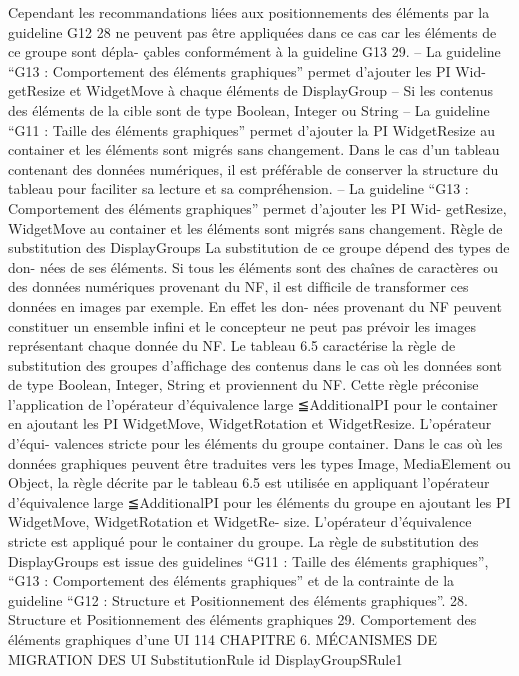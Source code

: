 \documentclass{article}
\begin{document}
Cependant les recommandations liées aux positionnements des éléments par la guideline
G12 28 ne peuvent pas être appliquées dans ce cas car les éléments de ce groupe sont dépla-
çables conformément à la guideline G13 29.
– La guideline “G13 : Comportement des éléments graphiques” permet d’ajouter les PI Wid-
getResize et WidgetMove à chaque éléments de DisplayGroup
– Si les contenus des éléments de la cible sont de type Boolean, Integer ou String
– La guideline “G11 : Taille des éléments graphiques” permet d’ajouter la PI WidgetResize au
container et les éléments sont migrés sans changement. Dans le cas d’un tableau contenant
des données numériques, il est préférable de conserver la structure du tableau pour faciliter
sa lecture et sa compréhension.
– La guideline “G13 : Comportement des éléments graphiques” permet d’ajouter les PI Wid-
getResize, WidgetMove au container et les éléments sont migrés sans changement.
Règle de substitution des DisplayGroups
La substitution de ce groupe dépend des types de don-
nées de ses éléments. Si tous les éléments sont des chaînes de caractères ou des données numériques
provenant du NF, il est difﬁcile de transformer ces données en images par exemple. En effet les don-
nées provenant du NF peuvent constituer un ensemble inﬁni et le concepteur ne peut pas prévoir
les images représentant chaque donnée du NF. Le tableau 6.5 caractérise la règle de substitution des
groupes d’afﬁchage des contenus dans le cas où les données sont de type Boolean, Integer, String et
proviennent du NF. Cette règle préconise l’application de l’opérateur d’équivalence large ≦AdditionalPI
pour le container en ajoutant les PI WidgetMove, WidgetRotation et WidgetResize. L’opérateur d’équi-
valences stricte pour les éléments du groupe container.
Dans le cas où les données graphiques peuvent être traduites vers les types Image, MediaElement
ou Object, la règle décrite par le tableau 6.5 est utilisée en appliquant l’opérateur d’équivalence large
≦AdditionalPI pour les éléments du groupe en ajoutant les PI WidgetMove, WidgetRotation et WidgetRe-
size. L’opérateur d’équivalence stricte est appliqué pour le container du groupe.
La règle de substitution des DisplayGroups est issue des guidelines “G11 : Taille des éléments
graphiques”, “G13 : Comportement des éléments graphiques” et de la contrainte de la guideline
“G12 : Structure et Positionnement des éléments graphiques”.
28. Structure et Positionnement des éléments graphiques
29. Comportement des éléments graphiques d’une UI
114
CHAPITRE 6. MÉCANISMES DE MIGRATION DES UI
SubstitutionRule
id
DisplayGroupSRule1
\end{document}
